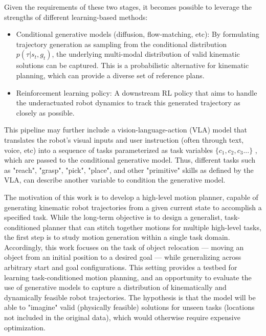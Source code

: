 Given the requirements of these two stages, it becomes possible to leverage the strengths of different learning-based methods:
\begin{itemize}
    \item Conditional generative models (diffusion, flow-matching, etc): By formulating trajectory generation as sampling from the conditional distribution \(p(\tau | s_t, g_t)\), the underlying multi-modal distribution of valid kinematic solutions can be captured. This is a probabilistic alternative for kinematic planning, which can provide a diverse set of reference plans.
    \item Reinforcement learning policy: A downstream RL policy that aims to handle the underactuated robot dynamics to track this generated trajectory as closely as possible.
\end{itemize}

This pipeline may further include a vision-language-action (VLA) model that translates the robot's visual inputs and user instruction (often through text, voice, etc) into a sequence of tasks parameterized as task variables $\{c_1, c_2, c_3...\}$ , which are passed to the conditional generative model. Thus, different tasks such as "reach", "grasp", "pick", "place", and other "primitive" skills as defined by the VLA, can describe another variable to condition the generative model.

The motivation of this work is to develop a high-level motion planner, capable of generating kinematic robot trajectories from a given current state to accomplish a specified task. While the long-term objective is to design a generalist, task-conditioned planner that can stitch together motions for multiple high-level tasks, the first step is to study motion generation within a single task domain. Accordingly, this work focuses on the task of object relocation — moving an object from an initial position to a desired goal — while generalizing across arbitrary start and goal configurations. This setting provides a testbed for learning task-conditioned motion planning, and an opportunity to evaluate the use of generative models to capture a distribution of kinematically and dynamically feasible robot trajectories. The hypothesis is that the model will be able to "imagine" valid (physically feasible) solutions for unseen tasks (locations not included in the original data), which would otherwise require expensive optimization.

